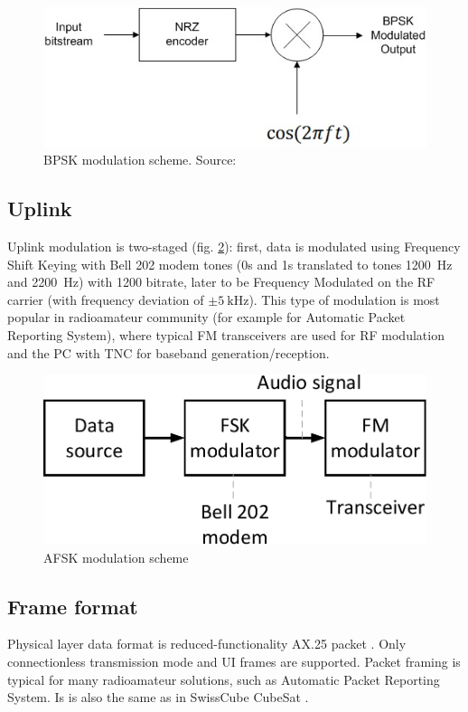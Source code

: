 \begin{figure}[H]
    \centering
    \includegraphics[width=0.7\paperwidth]{img/5/bpsk_modulator.jpg}
    \caption{BPSK modulation scheme. Source: \cite{bpsk_modulator}}
    \label{bpsk_modulator}
\end{figure}


\subsection{Uplink}
Uplink modulation is two-staged (fig. \ref{afsk_modulator}): first, data is modulated using Frequency Shift Keying with Bell 202 modem tones (0s and 1s translated to tones \SI{1200}{\hertz} and \SI{2200}{\hertz}) with \SI{1200}{\bps} bitrate, later to be Frequency Modulated on the RF carrier (with frequency deviation of $\pm\SI{5}{\kilo\hertz}$). This type of modulation is most popular in radioamateur community (for example for Automatic Packet Reporting System), where typical FM transceivers are used for RF modulation and the PC with TNC for baseband generation/reception. 

\begin{figure}[H]
    \centering
    \includegraphics[width=0.7\paperwidth]{img/5/afsk_modulator.pdf}
    \caption{AFSK modulation scheme}
    \label{afsk_modulator}
\end{figure}

\subsection{Frame format}
Physical layer data format is reduced-functionality AX.25 packet \cite{AX25_standard}. Only connectionless transmission mode and UI frames are supported. Packet framing is typical for many radioamateur solutions, such as Automatic Packet Reporting System. Is is also the same as in SwissCube CubeSat \cite{SwissCube_AX25}.


